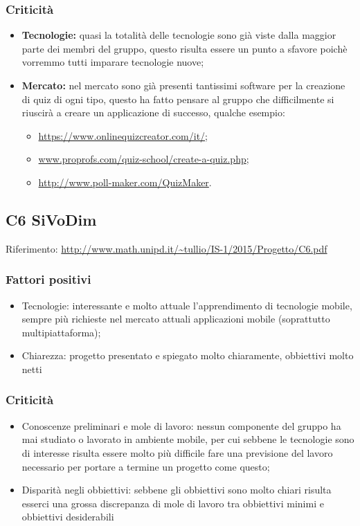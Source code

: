 \documentclass{scalatekids-article}
\begin{document}
\subsubsection{Criticità}
\begin{itemize}
  \item \textbf{Tecnologie:} quasi la totalità delle tecnologie sono già viste dalla maggior parte dei membri del gruppo, questo risulta essere un punto a sfavore poichè vorremmo tutti imparare tecnologie nuove;
  \item \textbf{Mercato:} nel mercato sono già presenti tantissimi software per la creazione di quiz di ogni tipo, questo ha fatto pensare al gruppo che difficilmente si riuscirà a creare un applicazione di successo, qualche esempio:
  \begin{itemize}
    \item\url{https://www.onlinequizcreator.com/it/};
    \item\url{www.proprofs.com/quiz-school/create-a-quiz.php};
    \item\url{http://www.poll-maker.com/QuizMaker}.
  \end{itemize}
\end{itemize}

\subsection{C6 SiVoDim}
Riferimento: \url{http://www.math.unipd.it/~tullio/IS-1/2015/Progetto/C6.pdf}\\
\subsubsection{Fattori positivi}
\begin{itemize}
  \item{Tecnologie:} interessante e molto attuale l'apprendimento di tecnologie mobile, sempre più richieste nel mercato attuali applicazioni mobile (soprattutto multipiattaforma);
  \item{Chiarezza:} progetto presentato e spiegato molto chiaramente, obbiettivi molto netti
\end{itemize}
\subsubsection{Criticità}
\begin{itemize}
  \item{Conoscenze preliminari e mole di lavoro:} nessun componente del gruppo ha mai studiato o lavorato in ambiente mobile, per cui sebbene le tecnologie sono di interesse risulta essere molto più difficile fare una previsione del lavoro necessario per portare a termine un progetto come questo;
  \item{Disparità negli obbiettivi:} sebbene gli obbiettivi sono molto chiari risulta esserci una grossa discrepanza di mole di lavoro tra obbiettivi minimi e obbiettivi desiderabili
\end{itemize}
\end{document}
